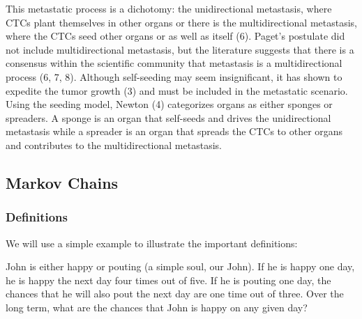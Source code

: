 \documentclass[letterpaper,12pt]{article}
\begin{document}
This metastatic process is a dichotomy: the unidirectional metastasis, where CTCs plant themselves in other organs or there is the multidirectional metastasis, where the CTCs seed other organs or as well as itself (6). Paget's postulate did not include multidirectional metastasis, but the literature suggests that there is a consensus within the scientific community that metastasis is a multidirectional process (6, 7, 8). Although self-seeding may seem insignificant, it has shown to expedite the tumor growth (3) and must be included in the metastatic scenario. Using the seeding model, Newton (4) categorizes organs as either sponges or spreaders. A sponge is an organ that self-seeds and drives the unidirectional metastasis while a spreader is an organ that spreads the CTCs to other organs and contributes to the multidirectional metastasis.

\subsection{Markov Chains} %

\subsubsection*{Definitions}

We will use a simple example to illustrate the important definitions:

John is either happy or pouting (a simple soul, our John). If he is happy one day, he is happy the next day four times out of five. If he is pouting one day, the chances that he will also pout the next day are one time out of three. Over the long term, what are the chances that John is happy on any given day?
\end{document}
